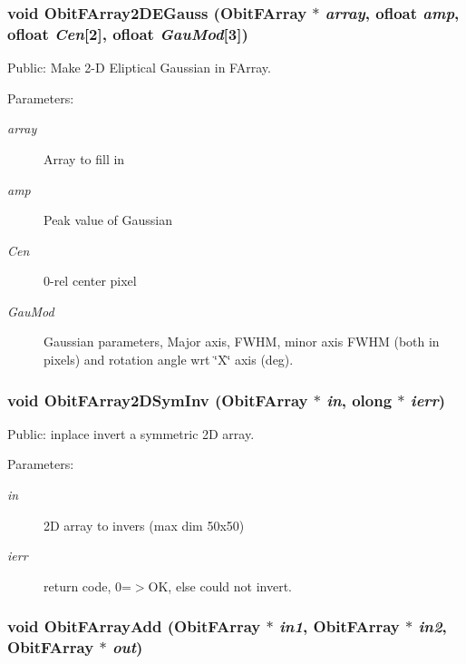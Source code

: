 \subsubsection{\setlength{\rightskip}{0pt plus 5cm}void Obit\-FArray2DEGauss ({\bf Obit\-FArray} $\ast$ {\em array}, {\bf ofloat} {\em amp}, {\bf ofloat} {\em Cen}[2], {\bf ofloat} {\em Gau\-Mod}[3])}\label{ObitFArray_8h_a104}


Public: Make 2-D Eliptical Gaussian in FArray. 

\begin{Desc}
\item[Parameters:]
\begin{description}
\item[{\em array}]Array to fill in \item[{\em amp}]Peak value of Gaussian \item[{\em Cen}]0-rel center pixel \item[{\em Gau\-Mod}]Gaussian parameters, Major axis, FWHM, minor axis FWHM (both in pixels) and rotation angle wrt \char`\"{}X\char`\"{} axis (deg). \end{description}
\end{Desc}
\subsubsection{\setlength{\rightskip}{0pt plus 5cm}void Obit\-FArray2DSym\-Inv ({\bf Obit\-FArray} $\ast$ {\em in}, {\bf olong} $\ast$ {\em ierr})}\label{ObitFArray_8h_a102}


Public: inplace invert a symmetric 2D array. 

\begin{Desc}
\item[Parameters:]
\begin{description}
\item[{\em in}]2D array to invers (max dim 50x50) \item[{\em ierr}]return code, 0=$>$OK, else could not invert. \end{description}
\end{Desc}
\subsubsection{\setlength{\rightskip}{0pt plus 5cm}void Obit\-FArray\-Add ({\bf Obit\-FArray} $\ast$ {\em in1}, {\bf Obit\-FArray} $\ast$ {\em in2}, {\bf Obit\-FArray} $\ast$ {\em out})}\label{ObitFArray_8h_a93}


